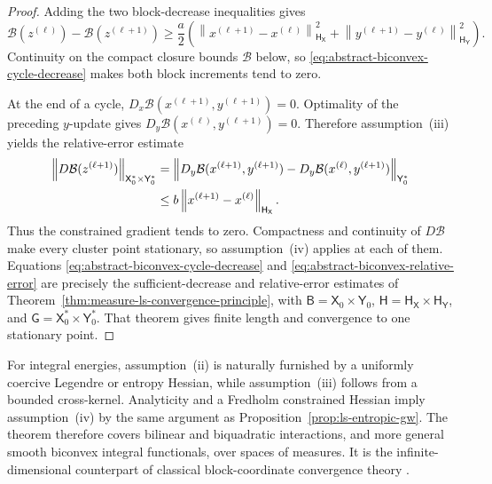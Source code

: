 \documentclass[11pt]{article}
\theoremstyle{definition}
\theoremstyle{remark}
\newcommand{\Bcal}{\mathcal B}
\newcommand{\norm}[1]{\left\lVert #1\right\rVert}
\begin{document}
\begin{proof}
Adding the two block-decrease inequalities gives
\begin{equation}\label{eq:abstract-biconvex-cycle-decrease}
 \Bcal(z^{(\ell)})-\Bcal(z^{(\ell+1)})
 \geq
 \frac a2
 \left(
  \norm{x^{(\ell+1)}-x^{(\ell)}}_{\mathsf H_{\mathsf X}}^2
  +
  \norm{y^{(\ell+1)}-y^{(\ell)}}_{\mathsf H_{\mathsf Y}}^2
 \right).
\end{equation}
Continuity on the compact closure bounds \(\Bcal\) below, so
\eqref{eq:abstract-biconvex-cycle-decrease} makes both block increments tend
to zero.

At the end of a cycle,
\(D_x\Bcal(x^{(\ell+1)},y^{(\ell+1)})=0\).  Optimality of the preceding
\(y\)-update gives \(D_y\Bcal(x^{(\ell)},y^{(\ell+1)})=0\).  Therefore
assumption~(iii) yields the relative-error estimate
\begin{align}
 \norm{D\Bcal(z^{(\ell+1)})}_{\mathsf X_0^*\times\mathsf Y_0^*}
 &=
 \norm{
  D_y\Bcal(x^{(\ell+1)},y^{(\ell+1)})
  -D_y\Bcal(x^{(\ell)},y^{(\ell+1)})
 }_{\mathsf Y_0^*}
 \notag\\
 &\leq
 b\norm{x^{(\ell+1)}-x^{(\ell)}}_{\mathsf H_{\mathsf X}}.
 \label{eq:abstract-biconvex-relative-error}
\end{align}
Thus the constrained gradient tends to zero.  Compactness and continuity of
\(D\Bcal\) make every cluster point stationary, so assumption~(iv) applies
at each of them.  Equations
\eqref{eq:abstract-biconvex-cycle-decrease} and
\eqref{eq:abstract-biconvex-relative-error} are precisely the
sufficient-decrease and relative-error estimates of
Theorem~\ref{thm:measure-ls-convergence-principle}, with
\(\mathsf B=\mathsf X_0\times\mathsf Y_0\),
\(\mathsf H=\mathsf H_{\mathsf X}\times\mathsf H_{\mathsf Y}\), and
\(\mathsf G=\mathsf X_0^*\times\mathsf Y_0^*\).  That theorem gives finite
length and convergence to one stationary point.
\end{proof}

For integral energies, assumption~(ii) is naturally furnished by a uniformly
coercive Legendre or entropy Hessian, while assumption~(iii) follows from a
bounded cross-kernel.  Analyticity and a Fredholm constrained Hessian imply
assumption~(iv) by the same argument as
Proposition~\ref{prop:ls-entropic-gw}.  The theorem therefore covers
bilinear and biquadratic interactions, and more general smooth biconvex
integral functionals, over spaces of measures.  It is the
infinite-dimensional counterpart of classical block-coordinate convergence
theory \citep{Tseng2001}.
\end{document}
